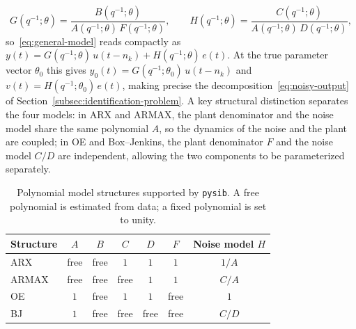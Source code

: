\documentclass[acmsmall,screen,review]{acmart}
\begin{document}
\begin{equation}
    G(q^{-1};\theta) = \frac{B(q^{-1};\theta)}{A(q^{-1};\theta)\,F(q^{-1};\theta)},
    \qquad
    H(q^{-1};\theta) = \frac{C(q^{-1};\theta)}{A(q^{-1};\theta)\,D(q^{-1};\theta)},
    \label{eq:gh}
\end{equation}
so~\eqref{eq:general-model} reads compactly as
$y(t) = G(q^{-1};\theta)\,u(t-n_k) + H(q^{-1};\theta)\,e(t)$.
At the true parameter vector $\theta_0$ this gives
$y_0(t) = G(q^{-1};\theta_0)\,u(t-n_k)$ and
$v(t) = H(q^{-1};\theta_0)\,e(t)$, making precise the
decomposition~\eqref{eq:noisy-output} of
Section~\ref{subsec:identification-problem}.
A key structural distinction
separates the four models: in ARX and ARMAX, the plant denominator and the
noise model share the same polynomial $A$, so the dynamics of the noise
and the plant are coupled; in OE and Box--Jenkins, the plant denominator
$F$ and the noise model $C/D$ are independent, allowing the two components
to be parameterized separately.

\begin{table}[t]
    \caption{Polynomial model structures supported by \texttt{pysib}.
             A free polynomial is estimated from data; a fixed polynomial
             is set to unity.}
    \label{tab:structures}
    \centering
    \footnotesize
    \setlength{\tabcolsep}{4pt}
    \begin{tabular}{lcccccc}
        \toprule
        Structure & $A$ & $B$ & $C$ & $D$ & $F$ & Noise model $H$ \\
        \midrule
        ARX   & free & free & $1$ & $1$ & $1$ & $1/A$ \\
        ARMAX & free & free & free & $1$ & $1$ & $C/A$ \\
        OE    & $1$  & free & $1$ & $1$ & free & $1$ \\
        BJ    & $1$  & free & free & free & free & $C/D$ \\
        \bottomrule
    \end{tabular}
\end{table}
\end{document}
